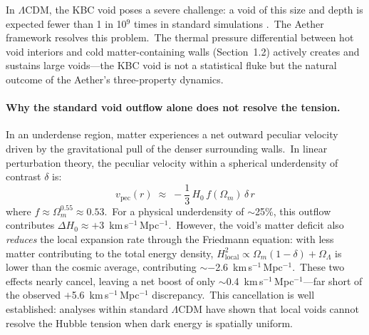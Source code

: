 ﻿\documentclass[12pt,letterpaper]{article}
\begin{document}
In $\Lambda$CDM, the KBC void poses a severe challenge: a void of this size
and depth is expected fewer than 1 in 10$^{9}$ times in standard simulations
\cite{haslbauer2020}.\ The Aether framework resolves this problem.\ The thermal
pressure differential between hot void interiors and cold matter-containing
walls (Section~1.2) actively creates and sustains large voids---the KBC void is
not a statistical fluke but the natural outcome of the Aether's three-property
dynamics.

\paragraph{Why the standard void outflow alone does not resolve the tension.}
In an underdense region, matter experiences a net outward peculiar velocity
driven by the gravitational pull of the denser surrounding walls.\ In linear
perturbation theory, the peculiar velocity within a spherical underdensity
of contrast $\delta$ is:
%
\begin{equation}
  v_{\mathrm{pec}}(r) \;\approx\; -\frac{1}{3}\,H_0\,f(\Omega_m)\,\delta\,r
  \label{eq:vpec}
\end{equation}
%
where $f \approx \Omega_m^{0.55} \approx 0.53$.\ For a physical underdensity of
$\sim$25\%, this outflow contributes $\Delta H_0 \approx +3$~km\,s$^{-1}$\,Mpc$^{-1}$.\ However, the void's matter deficit also \emph{reduces}
the local expansion rate through the Friedmann equation: with less matter
contributing to the total energy density, $H_{\mathrm{local}}^2 \propto
\Omega_m(1 - \delta) + \Omega_\Lambda$ is lower than the cosmic average,
contributing $\sim$$-$2.6~km\,s$^{-1}$\,Mpc$^{-1}$.\ These two effects nearly
cancel, leaving a net boost of only $\sim$0.4~km\,s$^{-1}$\,Mpc$^{-1}$---far
short of the observed $+$5.6~km\,s$^{-1}$\,Mpc$^{-1}$ discrepancy.\ This
cancellation is well established: analyses within standard $\Lambda$CDM have shown
that local voids cannot resolve the Hubble tension when dark energy is spatially
uniform.
\end{document}
